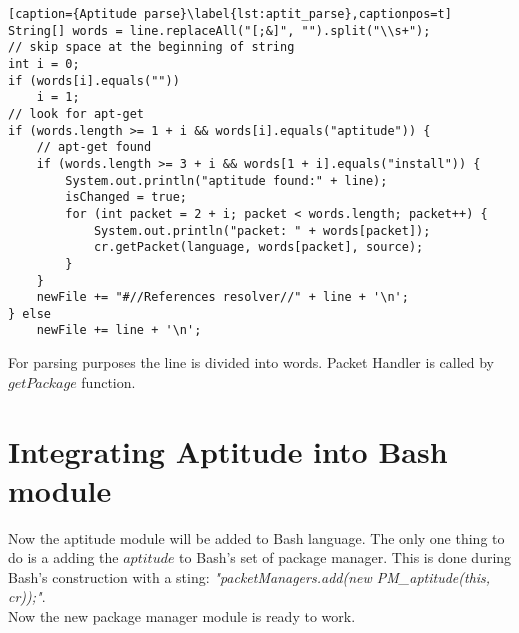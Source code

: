 \begin{lstlisting}[caption={Aptitude parse}\label{lst:aptit_parse},captionpos=t]
String[] words = line.replaceAll("[;&]", "").split("\\s+");
// skip space at the beginning of string
int i = 0;
if (words[i].equals(""))
	i = 1;
// look for apt-get
if (words.length >= 1 + i && words[i].equals("aptitude")) {
	// apt-get found
	if (words.length >= 3 + i && words[1 + i].equals("install")) {
		System.out.println("aptitude found:" + line);
		isChanged = true;
		for (int packet = 2 + i; packet < words.length; packet++) {
			System.out.println("packet: " + words[packet]);
			cr.getPacket(language, words[packet], source);
		}
	}
	newFile += "#//References resolver//" + line + '\n';
} else
	newFile += line + '\n';
\end{lstlisting}
For parsing purposes the line is divided into words. Packet Handler is called by $getPackage$ function.
\section{Integrating Aptitude into Bash module}\label{sec:aptitude_int}
Now the aptitude module will be added to Bash language.
The only one thing to do is a adding the $aptitude$ to Bash's set of package manager.
This is done during Bash's construction with a sting: \emph{"packetManagers.add(new PM\_aptitude(this, cr));"}.\\
Now the new package manager module is ready to work.